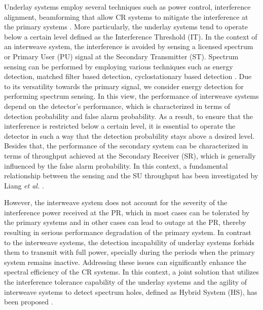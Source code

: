 Underlay systems employ several techniques such as power control, interference alignment, beamforming that allow CR systems to mitigate the interference at the primary systems \cite{Sharma15}. More particularly, the underlay systems tend to operate below a certain level defined as the Interference Threshold (IT). 
In the context of an interweave system, the interference is avoided by sensing a licensed spectrum or Primary User (PU) signal at the Secondary Transmitter (ST).
Spectrum sensing can be performed by employing various techniques such as energy detection, matched filter based detection, cyclostationary based detection \cite{Sharma15}. Due to its versatility towards the primary signal, we consider energy detection for performing spectrum sensing. In this view, the performance of interweave systems depend on the detector's performance, which is characterized in terms of detection probability and false alarm probability. 
As a result, to ensure that the interference is restricted below a certain level, it is essential to operate the detector in such a way that the detection probability stays above a desired level. Besides that, the performance of the secondary system can be characterized in terms of throughput achieved at the Secondary Receiver (SR), which is generally influenced by the false alarm probability. In this context, a fundamental relationship between the sensing and the SU throughput has been investigated by Liang \textit{et al.} \cite{Liang08}. 

However, the interweave system does not account for the severity of the interference power received at the PR, which in most cases can be tolerated by the primary systems and in other cases can lead to outage at the PR, thereby resulting in serious performance degradation of the primary system. In contrast to the interweave systems, the detection incapability of underlay systems forbids them to transmit with full power, specially during the periods when the primary system remains inactive. Addressing these issues can significantly enhance the spectral efficiency of the CR systems. In this context, a joint solution that utilizes the interference tolerance capability of the underlay systems and the agility of interweave systems to detect spectrum holes, defined as Hybrid System (HS), has been proposed \cite{Kang09, Oh10, Senthu12, Jiang13, Sharma14}. 

